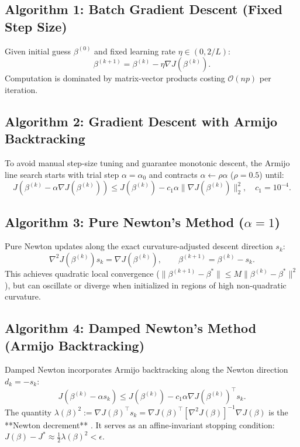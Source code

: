 \documentclass[11pt,a4paper]{article}
\theoremstyle{remark}\newtheorem{remark}{Remark}
\begin{document}
\subsection{Algorithm 1: Batch Gradient Descent (Fixed Step Size)}
Given initial guess $\beta^{(0)}$ and fixed learning rate $\eta \in (0, 2/L)$:
\begin{equation}
  \beta^{(k+1)} = \beta^{(k)} - \eta \nabla J(\beta^{(k)}).
\end{equation}
Computation is dominated by matrix-vector products costing $\mathcal{O}(np)$ per iteration.

\subsection{Algorithm 2: Gradient Descent with Armijo Backtracking}
To avoid manual step-size tuning and guarantee monotonic descent, the Armijo line search starts with trial step $\alpha = \alpha_0$ and contracts $\alpha \leftarrow \rho \alpha$ ($\rho = 0.5$) until:
\begin{equation}
  J(\beta^{(k)} - \alpha \nabla J(\beta^{(k)})) \le J(\beta^{(k)}) - c_1 \alpha \|\nabla J(\beta^{(k)})\|_2^2, \quad c_1 = 10^{-4}.
\end{equation}

\subsection{Algorithm 3: Pure Newton's Method (\texorpdfstring{$\alpha=1$}{alpha=1})}
Pure Newton updates along the exact curvature-adjusted descent direction $s_k$:
\begin{equation}
  \nabla^2 J(\beta^{(k)}) s_k = \nabla J(\beta^{(k)}), \qquad \beta^{(k+1)} = \beta^{(k)} - s_k.
\end{equation}
This achieves quadratic local convergence ($\|\beta^{(k+1)} - \beta^*\| \le M \|\beta^{(k)} - \beta^*\|^2$), but can oscillate or diverge when initialized in regions of high non-quadratic curvature.

\subsection{Algorithm 4: Damped Newton's Method (Armijo Backtracking)}
Damped Newton incorporates Armijo backtracking along the Newton direction $d_k = -s_k$:
\begin{equation}
  J(\beta^{(k)} - \alpha s_k) \le J(\beta^{(k)}) - c_1 \alpha \nabla J(\beta^{(k)})^\top s_k.
\end{equation}
The quantity $\lambda(\beta)^2 := \nabla J(\beta)^\top s_k = \nabla J(\beta)^\top [\nabla^2 J(\beta)]^{-1} \nabla J(\beta)$ is the **Newton decrement** \cite{boyd2004}. It serves as an affine-invariant stopping condition: $J(\beta) - J^* \approx \frac{1}{2}\lambda(\beta)^2 < \epsilon$.
\end{document}
